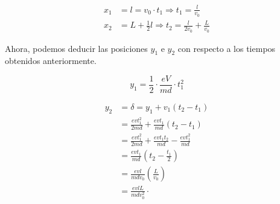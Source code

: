 \documentclass[11pt]{article}
\begin{document}
\begin{align*}
  x_1 &= l = v_0 \cdot t_1 \Rightarrow t_1 = \frac{l}{v_0} \\
  x_2 &= L + \frac{1}{2}l \Rightarrow t_2 = \frac{l}{2v_0} + \frac{L}{v_0}
\end{align*}

Ahora, podemos deducir las posiciones $y_1$ e $y_2$ con respecto a los tiempos
obtenidos anteriormente.

\begin{equation*}
  y_1 = \frac{1}{2} \cdot \frac{eV}{md} \cdot t_1^2
\end{equation*}

\begin{align*}
  y_2 &= \delta = y_1 + v_1 (t_2 - t_1)  \\
      &= \frac{e v t_1^2}{2 m d} + \frac{e v t_1}{m d} (t_2 - t_1) \\
      &= \frac{e v t_1^2}{2 m d} + \frac{e v t_1 t_2}{m d} - \frac{e v t_1^2}{m d} \\
      &= \frac{e v t_1}{m d} (t_2 - \frac{t_1}{2}) \\
      &= \frac{e v l}{m d v_0} (\frac{L}{v_0}) \\
      &= \frac{e v l L}{m d v_0^2} \cdot
\end{align*}
\end{document}

